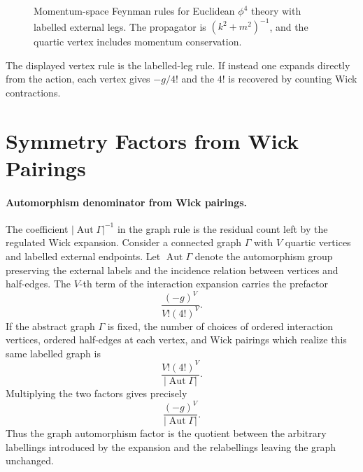 \begin{figure}[H]
\centering
{}
\caption{Momentum-space Feynman rules for Euclidean \(\phi^4\) theory with
labelled external legs.  The propagator is \((k^2+m^2)^{-1}\), and the quartic
vertex includes momentum conservation.}
\label{fig:euclidean-phi-four-feynman-rules}
\end{figure}

The displayed vertex rule is the labelled-leg rule. If instead one expands
directly from the action, each vertex gives \(-g/4!\) and the \(4!\) is
recovered by counting Wick contractions.

\section{Symmetry Factors from Wick Pairings}

\paragraph{Automorphism denominator from Wick pairings.}
The coefficient \( |\operatorname{Aut}\Gamma|^{-1} \) in the graph rule is
the residual count left by the regulated Wick expansion. Consider a connected
graph \(\Gamma\) with \(V\) quartic
vertices and labelled external endpoints. Let
\(\operatorname{Aut}\Gamma\) denote the automorphism group preserving the
external labels and the incidence relation between vertices and half-edges.
The \(V\)-th term of the interaction expansion carries the prefactor
\[
  \frac{(-g)^V}{V!(4!)^V}.
\]
If the abstract graph \(\Gamma\) is fixed, the number of choices of ordered
interaction vertices, ordered half-edges at each vertex, and Wick pairings
which realize this same labelled graph is
\[
  \frac{V!(4!)^V}{|\operatorname{Aut}\Gamma|}.
\]
Multiplying the two factors gives precisely
\[
  \frac{(-g)^V}{|\operatorname{Aut}\Gamma|}.
\]
Thus the graph automorphism factor is the quotient between the arbitrary
labellings introduced by the expansion and the relabellings leaving the graph
unchanged.

